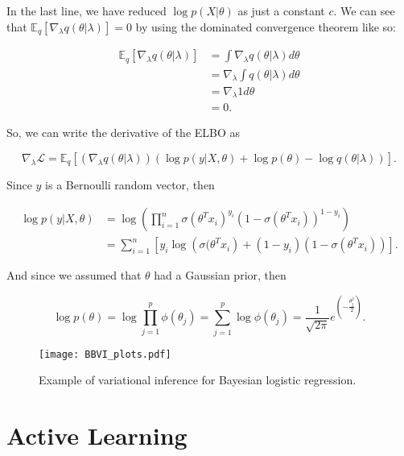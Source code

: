In the last line, we have reduced $\log p(X | \theta)$ as just a constant $c$. We can see that $\mathbb{E}_q \left[ \nabla_{\lambda} q(\theta | \lambda) \right] = 0$ by using the dominated convergence theorem \cite{ranganath2014black} like so:

\begin{equation*}
  \begin{split}
      \mathbb{E}_q \left[ \nabla_{\lambda} q(\theta | \lambda) \right] &=
      \int \nabla_{\lambda} q(\theta | \lambda) d\theta \\
      &= \nabla_{\lambda} \int q(\theta | \lambda) d\theta \\
      &= \nabla_{\lambda} 1 d\theta \\
      &= 0.
  \end{split}
\end{equation*}

So, we can write the derivative of the ELBO as

$$
  \nabla_{\lambda} \mathcal{L} = \mathbb{E}_q \left[ \left( \nabla_{\lambda} q(\theta | \lambda) \right) \left( \log p(y | X, \theta) + \log p(\theta) - \log q(\theta | \lambda) \right) \right].
$$

Since $y$ is a Bernoulli random vector, then


\begin{equation*}
  \begin{split}
      \log p(y | X, \theta) &=
      \log \left( \prod_{i = 1}^n \sigma(\theta^T x_i)^{y_i} (1 - \sigma(\theta^T x_i))^{1-y_i} \right) \\
      &= \sum_{i = 1}^n \left[ y_i \log \left( \sigma(\theta^T x_i \right) + (1 - y_i) (1 - \sigma(\theta^T x_i)) \right].
  \end{split}
\end{equation*}

And since we assumed that $\theta$ had a Gaussian prior, then

$$
  \log p(\theta) = \log \prod_{j = 1}^p \phi(\theta_j) = \sum_{j = 1}^p \log \phi(\theta_j) = \frac{1}{\sqrt{2 \pi}} e^{\left( -\frac{\theta_j^2}{2} \right)}.
$$


\begin{figure}[H]
    \centering
    \texttt{[image: BBVI\_plots.pdf]}
    \caption{Example of variational inference for Bayesian logistic regression.}
    \label{fig:BBVI_plots}
\end{figure}


\section{Active Learning}
